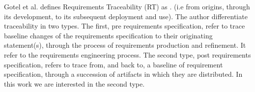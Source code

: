 Gotel et al. \cite{gotel_analysis_1994} defines Requirements Traceability (RT) as . (i.e from origins, through its development, to its subsequent deployment and use). The author differentiate traceability in two types. The first, pre requirements specification, refer to trace baseline changes of the requirements specification to their originating statement(s), through the process of requirements production and refinement. It refer to the requirements engineering process. The second type, post requirements specification, refers to trace from, and back to, a baseline of requirement specification, through a succession of artifacts in which they are distributed.
In this work we are interested in the second type.


